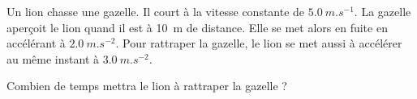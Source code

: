 \newpage




\hauteurLargeurCadreReponse		{8mm}{3cm}
\initialisationEntrainement

Un lion chasse une gazelle. Il court à la vitesse constante de 
$\SI{5,0}{m.s^{-1}}$. La gazelle aperçoit  le lion quand il est à \SI{10}{m} de 
distance. Elle se met alors en fuite en accélérant à $\SI{2,0}{m.s^{-2}}$. 
Pour rattraper la gazelle, le lion se met aussi à accélérer au même 
instant à $\SI{3,0}{m.s^{-2}}$.


\debutEntrainement


\begin{enonce}
	Combien de temps mettra le lion à rattraper la gazelle ?
\end{enonce}


